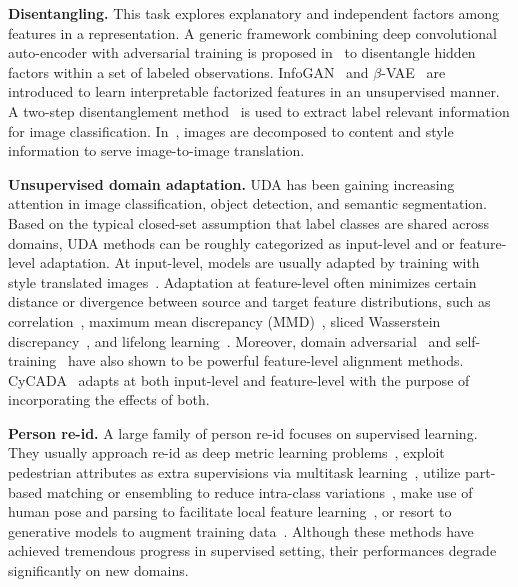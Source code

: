 \documentclass[runningheads]{llncs}
\begin{document}
\textbf{Disentangling.} This task explores explanatory and independent factors among features in a representation. A generic framework combining deep convolutional auto-encoder with adversarial training is proposed in~\cite{mathieu2016disentangling} to disentangle hidden factors within a set of labeled observations. InfoGAN~\cite{chen2016infogan} and $\beta$-VAE~\cite{higgins2017beta} are introduced to learn interpretable factorized features in an unsupervised manner. A two-step disentanglement method~\cite{hadad2018two} is used to extract label relevant information for image classification. In~\cite{Huang_2018_ECCV,lee2018diverse}, images are decomposed to content and style information to serve image-to-image translation. 

 



\noindent\textbf{Unsupervised domain adaptation.} UDA has been gaining increasing attention in image classification, object detection, and semantic segmentation. Based on the typical closed-set assumption that label classes are shared across domains, UDA methods can be roughly categorized as input-level and or feature-level adaptation. At input-level, models are usually adapted by training with style translated images~\cite{dundar2020domain,Huang_2018_ECCV,lee2018diverse}. Adaptation at feature-level often minimizes certain distance or divergence between source and target feature distributions, such as correlation~\cite{sun2016deep}, maximum mean discrepancy (MMD)~\cite{long2015learning}, sliced Wasserstein discrepancy~\cite{lee2019sliced}, and lifelong learning~\cite{chen2020automated}. Moreover, domain adversarial~\cite{hong2018conditional,tzeng2017adversarial} and self-training~\cite{chen2020angular,Ge2020Mutual,zou2018unsupervised,Zou_2019_ICCV} have also shown to be powerful feature-level alignment methods. CyCADA~\cite{hoffman2018cycada} adapts at both input-level and feature-level with the purpose of incorporating the effects of both. 








\noindent\textbf{Person re-id.} A large family of person re-id focuses on supervised learning. They usually approach re-id as deep metric learning problems~\cite{Fan_2020_CVPR,hermans2017defense}, exploit pedestrian attributes as extra supervisions via multitask learning~\cite{su2016deep,wang2018transferable}, utilize part-based matching or ensembling to reduce intra-class variations~\cite{su2017pose,wei2017glad}, make use of human pose and parsing to facilitate local feature learning~\cite{semantic-parsing,zheng2020person}, or resort to generative models to augment training data~\cite{ge2018fd,zheng2019joint}. Although these methods have achieved tremendous progress in supervised setting, their performances degrade significantly on new domains.
\end{document}
